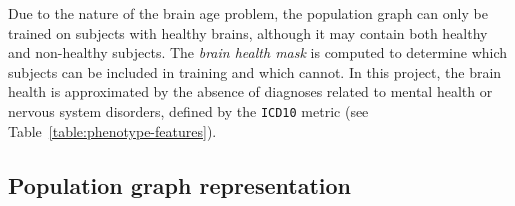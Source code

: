 Due to the nature of the brain age problem, the population graph can only be trained on subjects with healthy brains, although it may contain both healthy and non-healthy subjects. The \textit{brain health mask} is computed to determine which subjects can be included in training and which cannot. In this project, the brain health is approximated by the absence of diagnoses related to mental health or nervous system disorders, defined by the \texttt{ICD10} metric (see Table~\ref{table:phenotype-features}).

\subsection{Population graph representation}


\setlength{\LTpost}{0pt}
\renewcommand{\arraystretch}{1.25}

